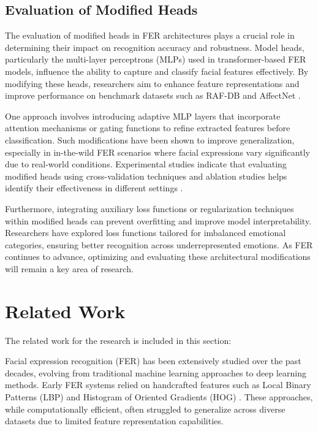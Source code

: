 \subsection{Evaluation of Modified Heads}

The evaluation of modified heads in \gls{FER} architectures plays a crucial role in determining their impact on recognition accuracy and robustness. Model heads, particularly the multi-layer perceptrons (MLPs) used in transformer-based \gls{FER} models, influence the ability to capture and classify facial features effectively. By modifying these heads, researchers aim to enhance feature representations and improve performance on benchmark datasets such as RAF-DB and AffectNet \cite{zheng_poster_2022}.

One approach involves introducing adaptive MLP layers that incorporate attention mechanisms or gating functions to refine extracted features before classification. Such modifications have been shown to improve generalization, especially in \gls{in-the-wild} \gls{FER} scenarios where facial expressions vary significantly due to real-world conditions. Experimental studies indicate that evaluating modified heads using cross-validation techniques and ablation studies helps identify their effectiveness in different settings \cite{abdullah_activator_2024}.

Furthermore, integrating auxiliary loss functions or regularization techniques within modified heads can prevent overfitting and improve model interpretability. Researchers have explored loss functions tailored for imbalanced emotional categories, ensuring better recognition across underrepresented emotions. As \gls{FER} continues to advance, optimizing and evaluating these architectural modifications will remain a key area of research.


  
\section{Related Work}

The related work for the research is included in this section:

Facial expression recognition (\gls{FER}) has been extensively studied over the past decades, evolving from traditional machine learning approaches to deep learning methods. Early \gls{FER} systems relied on handcrafted features such as Local Binary Patterns (LBP) \cite{el_moussati_local_2020} and Histogram of Oriented Gradients (HOG) \cite{carcagni_facial_2015}. These approaches, while computationally efficient, often struggled to generalize across diverse datasets due to limited feature representation capabilities. 

